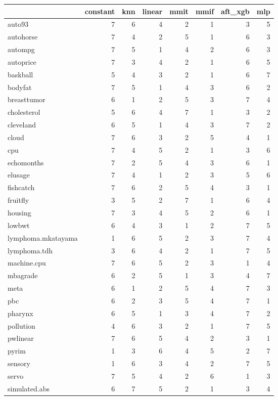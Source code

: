 \documentclass[12pt]{article}
\begin{document}
\begin{table}[!ht]
\small
\centering
\begin{tabular}{lrrrrrrr}
\toprule
 & constant & knn & linear & mmit & mmif & aft\_xgb & mlp \\
\midrule
auto93 & 7 & 6 & 4 & 2 & 1 & 3 & 5 \\
autohorse & 7 & 4 & 2 & 5 & 1 & 6 & 3 \\
autompg & 7 & 5 & 1 & 4 & 2 & 6 & 3 \\
autoprice & 7 & 3 & 4 & 2 & 1 & 6 & 5 \\
baskball & 5 & 4 & 3 & 2 & 1 & 6 & 7 \\
bodyfat & 7 & 5 & 1 & 4 & 3 & 6 & 2 \\
breasttumor & 6 & 1 & 2 & 5 & 3 & 7 & 4 \\
cholesterol & 5 & 6 & 4 & 7 & 1 & 3 & 2 \\
cleveland & 6 & 5 & 1 & 4 & 3 & 7 & 2 \\
cloud & 7 & 6 & 3 & 2 & 5 & 4 & 1 \\
cpu & 7 & 4 & 5 & 2 & 1 & 3 & 6 \\
echomonths & 7 & 2 & 5 & 4 & 3 & 6 & 1 \\
elusage & 7 & 4 & 1 & 2 & 3 & 5 & 6 \\
fishcatch & 7 & 6 & 2 & 5 & 4 & 3 & 1 \\
fruitfly & 3 & 5 & 2 & 7 & 1 & 6 & 4 \\
housing & 7 & 3 & 4 & 5 & 2 & 6 & 1 \\
lowbwt & 6 & 4 & 3 & 1 & 2 & 7 & 5 \\
lymphoma.mkatayama & 1 & 6 & 5 & 2 & 3 & 7 & 4 \\
lymphoma.tdh & 3 & 6 & 4 & 2 & 1 & 7 & 5 \\
machine.cpu & 7 & 6 & 5 & 2 & 3 & 1 & 4 \\
mbagrade & 6 & 2 & 5 & 1 & 3 & 4 & 7 \\
meta & 6 & 1 & 2 & 5 & 4 & 7 & 3 \\
pbc & 6 & 2 & 3 & 5 & 4 & 7 & 1 \\
pharynx & 6 & 5 & 1 & 3 & 4 & 7 & 2 \\
pollution & 4 & 6 & 3 & 2 & 1 & 7 & 5 \\
pwlinear & 7 & 6 & 5 & 4 & 2 & 3 & 1 \\
pyrim & 1 & 3 & 6 & 4 & 5 & 2 & 7 \\
sensory & 1 & 6 & 3 & 4 & 2 & 7 & 5 \\
servo & 7 & 5 & 4 & 2 & 6 & 1 & 3 \\
simulated.abs & 6 & 7 & 5 & 2 & 1 & 3 & 4 \\

\end{tabular}
\end{table}
\end{document}
